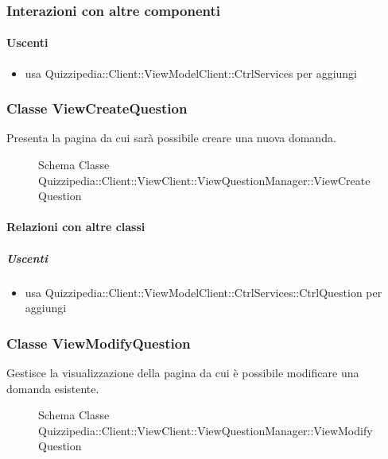 \subsubsection{Interazioni con altre componenti}
\paragraph{Uscenti}
\begin{itemize}
\item usa Quizzipedia::Client::ViewModelClient::CtrlServices per aggiungi
\end{itemize}
\subsubsection{Classe ViewCreateQuestion}
Presenta la pagina da cui sarà possibile creare una nuova domanda.
\begin{figure}[H]
\centering
\noindent{}
\caption[Schema Classe ViewCreateQuestion]{Schema Classe Quizzipedia::Client::ViewClient::ViewQuestionManager::ViewCreateQuestion}
\end{figure}
\paragraph{Relazioni con altre classi}
\subparagraph{Uscenti}
\begin{itemize}
\item usa Quizzipedia::Client::ViewModelClient::CtrlServices::CtrlQuestion per aggiungi
\end{itemize}
\subsubsection{Classe ViewModifyQuestion}
Gestisce la visualizzazione della pagina da cui è possibile modificare una domanda esistente.
\begin{figure}[H]
\centering
\noindent{}
\caption[Schema Classe ViewModifyQuestion]{Schema Classe Quizzipedia::Client::ViewClient::ViewQuestionManager::ViewModifyQuestion}
\end{figure}
